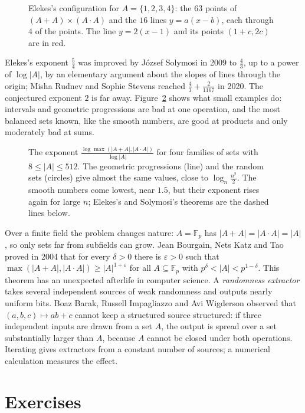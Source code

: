 \begin{figure}[ht]
\centering
{}
\caption{Elekes's configuration for $A=\{1,2,3,4\}$: the $63$ points of $(A+A)\times(A\cdot A)$ and the $16$ lines $y=a(x-b)$, each through $4$ of the points. The line $y=2(x-1)$ and its points $(1+c,2c)$ are in red.}
\label{fig:elekes}
\end{figure}

Elekes's exponent $\frac54$ was improved by József Solymosi in 2009 to $\frac43$, up to a power of $\log|A|$, by an elementary argument about the slopes of lines through the origin; Misha Rudnev and Sophie Stevens reached $\frac43+\frac2{1167}$ in 2020. The conjectured exponent $2$ is far away. Figure~\ref{fig:sumprod} shows what small examples do: intervals and geometric progressions are bad at one operation, and the most balanced sets known, like the smooth numbers, are good at products and only moderately bad at sums.

\begin{figure}[ht]
\centering
{}
\caption{The exponent $\frac{\log\max(|A+A|,|A\cdot A|)}{\log|A|}$ for four families of sets with $8\le|A|\le512$. The geometric progressions (line) and the random sets (circles) give almost the same values, close to $\log_n\frac{n^2}2$. The smooth numbers come lowest, near $1.5$, but their exponent rises again for large $n$; Elekes's and Solymosi's theorems are the dashed lines below.}
\label{fig:sumprod}
\end{figure}

Over a finite field the problem changes nature: $A=\mathbb F_p$ has $|A+A|=|A\cdot A|=|A|$, so only sets far from subfields can grow. Jean Bourgain, Nets Katz and Tao proved in 2004 that for every $\delta>0$ there is $\varepsilon>0$ such that $\max(|A+A|,|A\cdot A|)\ge|A|^{1+\varepsilon}$ for all $A\subseteq\mathbb F_p$ with $p^\delta<|A|<p^{1-\delta}$. This theorem has an unexpected afterlife in computer science. A \emph{randomness extractor} takes several independent sources of weak randomness and outputs nearly uniform bits. Boaz Barak, Russell Impagliazzo and Avi Wigderson observed that $(a,b,c)\mapsto ab+c$ cannot keep a structured source structured: if three independent inputs are drawn from a set $A$, the output is spread over a set substantially larger than $A$, because $A$ cannot be closed under both operations. Iterating gives extractors from a constant number of sources; a numerical calculation measures the effect.

\section{Exercises}

